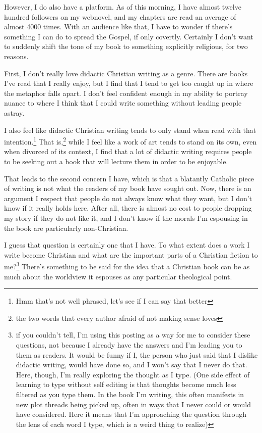 \documentclass[12pt]{article}[titlepage]
\newcommand{\1}{\={a}}
\newcommand{\2}{\={e}}
\newcommand{\3}{\={\i}}
\newcommand{\4}{\=o}
\newcommand{\5}{\=u}
\newcommand{\6}{\={A}}
\renewcommand{\,}{\textsuperscript{,}}
\begin{document}
However, I do also have a platform.
As of this morning, I have almost twelve hundred followers on my webnovel, and my chapters are read an average of almost 4000 times.
With an audience like that, I have to wonder if there's something I can do to spread the Gospel, if only covertly.
Certainly I don't want to suddenly shift the tone of my book to something explicitly religious, for two reasons.

First, I don't really love didactic Christian writing as a genre.
There are books I've read that I really enjoy, but I find that I tend to get too caught up in where the metaphor falls apart.
I don't feel confident enough in my ability to portray nuance to where I think that I could write something without leading people astray.

I also feel like didactic Christian writing tends to only stand when read with that intention.\footnote{Hmm that's not well phrased, let's see if I can say that better}
That is,\footnote{the two words that every author afraid of not making sense loves} while I feel like a work of art tends to stand on its own, even when divorced of its context, I find that a lot of didactic writing requires people to be seeking out a book that will lecture them in order to be enjoyable.

That leads to the second concern I have, which is that a blatantly Catholic piece of writing is not what the readers of my book have sought out.
Now, there is an argument I respect that people do not always know what they want, but I don't know if it really holds here.
After all, there is almost no cost to people dropping my story if they do not like it, and I don't know if the morals I'm espousing in the book are particularly non-Christian.

I guess that question is certainly one that I have.
To what extent does a work I write become Christian and what are the important parts of a Christian fiction to me?\footnote{if you couldn't tell, I'm using this posting as a way for me to consider these questions, not because I already have the answers and I'm leading you to them as readers.
It would be funny if I, the person who just said that I dislike didactic writing, would have done so, and I won't say that I never do that.
Here, though, I'm really exploring the thought as I type. (One side effect of learning to type without self editing is that thoughts become much less filtered as you type them.
In the book I'm writing, this often manifests in new plot threads being picked up, often in ways that I never could or would have considered.
Here it means that I'm approaching the question through the lens of each word I type, which is a weird thing to realize)}
There's something to be said for the idea that a Christian book can be as much about the worldview it espouses as any particular theological point.
\end{document}
